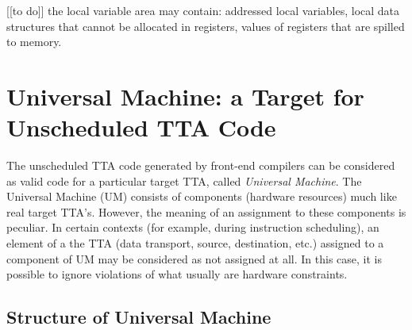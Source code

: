 \documentclass[twoside]{tce}
\begin{document}
[[to do]] the local variable area may contain: addressed local variables,
local data structures that cannot be allocated in registers, values of
registers that are spilled to memory.

\section{Universal Machine: a Target for Unscheduled TTA Code}
\label{sec:umachine}

The unscheduled TTA code generated by front-end compilers can be considered
as valid code for a particular target TTA, called \emph{Universal Machine}.
The Universal Machine (UM) consists of components (hardware resources) much
like real target TTA's.  However, the meaning of an assignment to these
components is peculiar.  In certain contexts (for example, during
instruction scheduling), an element of a the TTA (data transport, source,
destination, etc.) assigned to a component of UM may be considered as not
assigned at all.  In this case, it is possible to ignore violations of what
usually are hardware constraints.

\subsection{Structure of Universal Machine}
\end{document}
